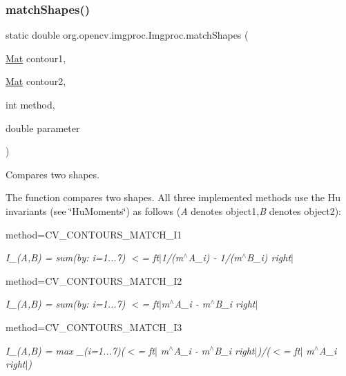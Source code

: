 \subsubsection{\texorpdfstring{match\+Shapes()}{matchShapes()}}
{\footnotesize\ttfamily static double org.\+opencv.\+imgproc.\+Imgproc.\+match\+Shapes (\begin{DoxyParamCaption}\item[{\mbox{\hyperlink{classorg_1_1opencv_1_1core_1_1_mat}{Mat}}}]{contour1,  }\item[{\mbox{\hyperlink{classorg_1_1opencv_1_1core_1_1_mat}{Mat}}}]{contour2,  }\item[{int}]{method,  }\item[{double}]{parameter }\end{DoxyParamCaption})\hspace{0.3cm}{\ttfamily [static]}}

Compares two shapes.

The function compares two shapes. All three implemented methods use the Hu invariants (see \char`\"{}\+Hu\+Moments\char`\"{}) as follows ({\itshape A} denotes {\ttfamily object1},{\itshape B} denotes {\ttfamily object2})\+:


\begin{DoxyItemize}
\item method=C\+V\+\_\+\+C\+O\+N\+T\+O\+U\+R\+S\+\_\+\+M\+A\+T\+C\+H\+\_\+\+I1 
\end{DoxyItemize}

{\itshape I\+\_(\+A,\+B) = sum(by\+: i=1...7) $<$= ft$\vert$1/(m$^\wedge$\+A\+\_\+i) -\/ 1/(m$^\wedge$\+B\+\_\+i) right$\vert$}


\begin{DoxyItemize}
\item method=C\+V\+\_\+\+C\+O\+N\+T\+O\+U\+R\+S\+\_\+\+M\+A\+T\+C\+H\+\_\+\+I2 
\end{DoxyItemize}

{\itshape I\+\_(\+A,\+B) = sum(by\+: i=1...7) $<$= ft$\vert$m$^\wedge$\+A\+\_\+i -\/ m$^\wedge$\+B\+\_\+i right$\vert$}


\begin{DoxyItemize}
\item method=C\+V\+\_\+\+C\+O\+N\+T\+O\+U\+R\+S\+\_\+\+M\+A\+T\+C\+H\+\_\+\+I3 
\end{DoxyItemize}

{\itshape I\+\_(\+A,\+B) = max \+\_\+(i=1...7)($<$= ft$\vert$ m$^\wedge$\+A\+\_\+i -\/ m$^\wedge$\+B\+\_\+i right$\vert$)/($<$= ft$\vert$ m$^\wedge$\+A\+\_\+i right$\vert$)}

